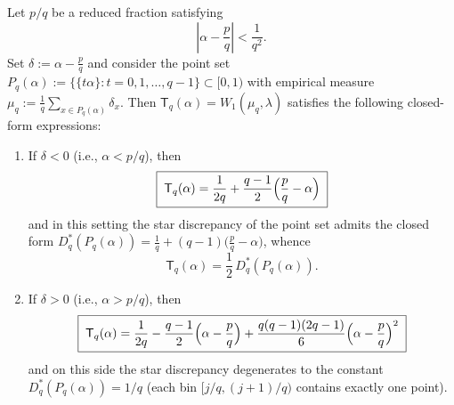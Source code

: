 \begin{theorem}\label{thm:kronecker-w1-denominator-closed-form}
Let \(p/q\) be a reduced fraction satisfying
\[
\left|\alpha-\frac pq\right|<\frac1{q^2}.
\]
Set \(\delta:=\alpha-\frac pq\) and consider the point set
\(
P_q(\alpha):=\{\{t\alpha\}:t=0,1,\dots,q-1\}\subset[0,1)
\)
with empirical measure \(\mu_q:=\frac1q\sum_{x\in P_q(\alpha)}\delta_x\).
Then \(\mathsf{T}_q(\alpha)=W_1(\mu_q,\lambda)\) satisfies the following closed-form expressions:
\begin{enumerate}
  \item If \(\delta<0\) (i.e., \(\alpha<p/q\)), then
  \begin{equation}\label{eq:kronecker-w1-bad-side-linear}
  \boxed{\;
  \mathsf{T}_q(\alpha)=\frac1{2q}+\frac{q-1}{2}\Bigl(\frac pq-\alpha\Bigr)\;}
  \end{equation}
  and in this setting the star discrepancy of the point set admits the closed form
  \(
  D_q^\ast(P_q(\alpha))=\frac1q+(q-1)\bigl(\frac pq-\alpha\bigr)
  \),
  whence
  \begin{equation}\label{eq:kronecker-w1-half-star}
  \boxed{\;\mathsf{T}_q(\alpha)=\frac12\,D_q^\ast(P_q(\alpha)).\;}
  \end{equation}
  \item If \(\delta>0\) (i.e., \(\alpha>p/q\)), then
  \begin{equation}\label{eq:kronecker-w1-good-side-quadratic}
  \boxed{\;
  \mathsf{T}_q(\alpha)=\frac1{2q}-\frac{q-1}{2}\Bigl(\alpha-\frac pq\Bigr)
  +\frac{q(q-1)(2q-1)}6\Bigl(\alpha-\frac pq\Bigr)^2\;}
  \end{equation}
  and on this side the star discrepancy degenerates to the constant \(D_q^\ast(P_q(\alpha))=1/q\) (each bin \([j/q,(j+1)/q)\) contains exactly one point).
\end{enumerate}
\end{theorem}
